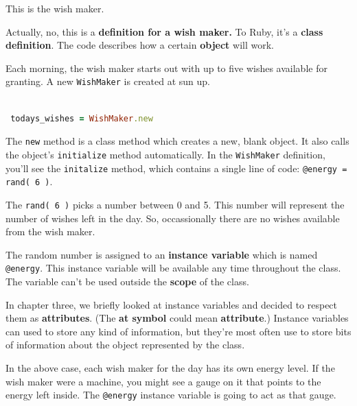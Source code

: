 \documentclass[10pt,twoside]{report}
\begin{document}
This is the wish maker.

Actually, no, this is a {\bf definition for a wish maker.}  To Ruby,
it's a {\bf class definition}. The code describes how a certain {\bf
  object} will work.

Each morning, the wish maker starts out with up to five wishes
available for granting. A new \lstinline[breaklines=true]|WishMaker|
is created at sun up.


\begin{lstlisting}[basicstyle=\ttfamily\color{basiccolor},
    commentstyle = \ttfamily\color{commentcolor},
    keywordstyle=\ttfamily\color{keywordscolor},
    stringstyle=\color{stringcolor},
    language=Ruby,
    basicstyle=\small\ttfamily,
    showstringspaces=false,
  ]

 todays_wishes = WishMaker.new

\end{lstlisting}


The \lstinline[breaklines=true]|new| method is a class method which
creates a new, blank object.  It also calls the object's
\lstinline[breaklines=true]|initialize| method automatically.  In the
\lstinline[breaklines=true]|WishMaker| definition, you'll see the
\lstinline[breaklines=true]|initalize| method, which contains a single
line of code: \lstinline[breaklines=true]|@energy = rand( 6 )|.

The \lstinline[breaklines=true]|rand( 6 )| picks a number between 0
and 5.  This number will represent the number of wishes left in the
day.  So, occassionally there are no wishes available from the wish
maker.

The random number is assigned to an {\bf instance variable} which is
named \lstinline[breaklines=true]|@energy|. This instance variable
will be available any time throughout the class.  The variable can't
be used outside the {\bf scope} of the class.

In chapter three, we briefly looked at instance variables and decided
to respect them as {\bf attributes}.  (The {\bf at symbol} could mean
{\bf attribute}.)  Instance variables can used to store any kind of
information, but they're most often use to store bits of information
about the object represented by the class.

In the above case, each wish maker for the day has its own energy
level.  If the wish maker were a machine, you might see a gauge on it
that points to the energy left inside. The
\lstinline[breaklines=true]|@energy| instance variable is going to act
as that gauge.
\end{document}
